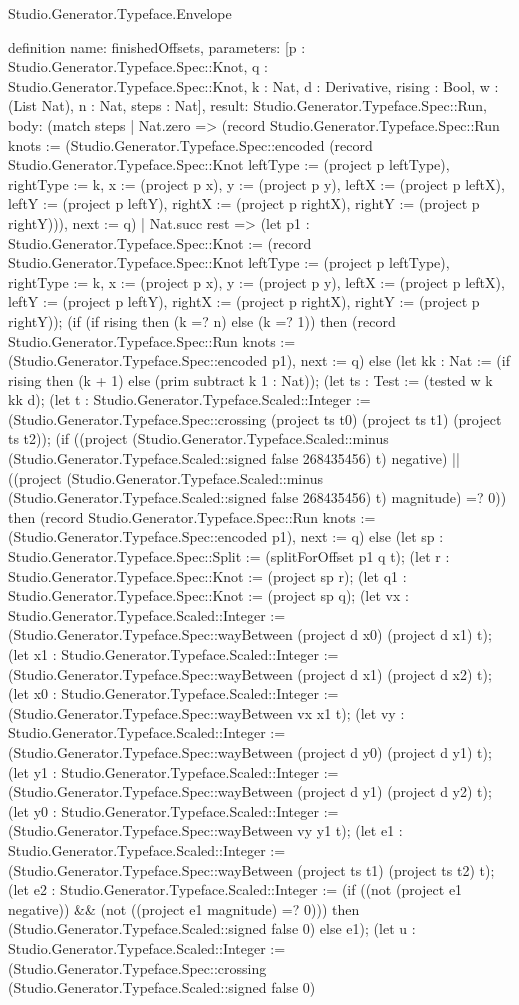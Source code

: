 \begin{lexlean}{Studio.Generator.Typeface.Envelope}
\begin{semanticmodule}
definition{
  name: finishedOffsets,
  parameters: [p : Studio.Generator.Typeface.Spec::Knot, q : Studio.Generator.Typeface.Spec::Knot, k : Nat, d : Derivative, rising : Bool, w : (List Nat), n : Nat, steps : Nat],
  result: Studio.Generator.Typeface.Spec::Run,
  body: (match steps
    | Nat.zero => (record Studio.Generator.Typeface.Spec::Run {knots := (Studio.Generator.Typeface.Spec::encoded (record Studio.Generator.Typeface.Spec::Knot {leftType := (project p leftType), rightType := k, x := (project p x), y := (project p y), leftX := (project p leftX), leftY := (project p leftY), rightX := (project p rightX), rightY := (project p rightY)})), next := q})
    | Nat.succ rest => (let p1 : Studio.Generator.Typeface.Spec::Knot := (record Studio.Generator.Typeface.Spec::Knot {leftType := (project p leftType), rightType := k, x := (project p x), y := (project p y), leftX := (project p leftX), leftY := (project p leftY), rightX := (project p rightX), rightY := (project p rightY)}); (if (if rising then (k =? n) else (k =? 1)) then (record Studio.Generator.Typeface.Spec::Run {knots := (Studio.Generator.Typeface.Spec::encoded p1), next := q}) else (let kk : Nat := (if rising then (k + 1) else (prim subtract k 1 : Nat)); (let ts : Test := (tested w k kk d); (let t : Studio.Generator.Typeface.Scaled::Integer := (Studio.Generator.Typeface.Spec::crossing (project ts t0) (project ts t1) (project ts t2)); (if ((project (Studio.Generator.Typeface.Scaled::minus (Studio.Generator.Typeface.Scaled::signed false 268435456) t) negative) || ((project (Studio.Generator.Typeface.Scaled::minus (Studio.Generator.Typeface.Scaled::signed false 268435456) t) magnitude) =? 0)) then (record Studio.Generator.Typeface.Spec::Run {knots := (Studio.Generator.Typeface.Spec::encoded p1), next := q}) else (let sp : Studio.Generator.Typeface.Spec::Split := (splitForOffset p1 q t); (let r : Studio.Generator.Typeface.Spec::Knot := (project sp r); (let q1 : Studio.Generator.Typeface.Spec::Knot := (project sp q); (let vx : Studio.Generator.Typeface.Scaled::Integer := (Studio.Generator.Typeface.Spec::wayBetween (project d x0) (project d x1) t); (let x1 : Studio.Generator.Typeface.Scaled::Integer := (Studio.Generator.Typeface.Spec::wayBetween (project d x1) (project d x2) t); (let x0 : Studio.Generator.Typeface.Scaled::Integer := (Studio.Generator.Typeface.Spec::wayBetween vx x1 t); (let vy : Studio.Generator.Typeface.Scaled::Integer := (Studio.Generator.Typeface.Spec::wayBetween (project d y0) (project d y1) t); (let y1 : Studio.Generator.Typeface.Scaled::Integer := (Studio.Generator.Typeface.Spec::wayBetween (project d y1) (project d y2) t); (let y0 : Studio.Generator.Typeface.Scaled::Integer := (Studio.Generator.Typeface.Spec::wayBetween vy y1 t); (let e1 : Studio.Generator.Typeface.Scaled::Integer := (Studio.Generator.Typeface.Spec::wayBetween (project ts t1) (project ts t2) t); (let e2 : Studio.Generator.Typeface.Scaled::Integer := (if ((not (project e1 negative)) && (not ((project e1 magnitude) =? 0))) then (Studio.Generator.Typeface.Scaled::signed false 0) else e1); (let u : Studio.Generator.Typeface.Scaled::Integer := (Studio.Generator.Typeface.Spec::crossing (Studio.Generator.Typeface.Scaled::signed false 0) }
\end{semanticmodule}
\end{lexlean}
